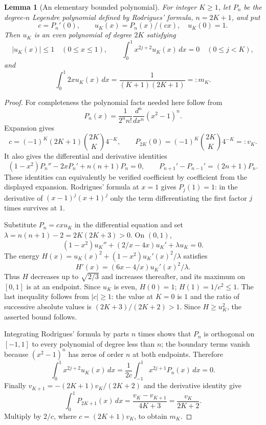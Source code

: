\documentclass[11pt]{article}
\newtheorem{lemma}{Lemma}
\begin{document}
\begin{lemma}[An elementary bounded polynomial]\label{lem:poly}
For integer $K\ge1$, let $P_n$ be the degree-$n$ Legendre polynomial defined
by Rodrigues' formula, $n=2K+1$, and put
\[
 c=P_n'(0),\qquad u_K(x)=P_n(x)/(cx),\quad u_K(0)=1.
\]
Then $u_K$ is an even polynomial of degree $2K$ satisfying
\[
 |u_K(x)|\le1\quad(0\le x\le1),\qquad
 \int_0^1x^{2j+2}u_K(x)\,dx=0\quad(0\le j<K),
\]
and
\[
 \int_0^1 2x u_K(x)\,dx=\frac1{(K+1)(2K+1)}=:m_K.
\]
\end{lemma}
\begin{proof}
For completeness the polynomial facts needed here follow from
\[
 P_n(x)=\frac1{2^n n!}\frac{d^n}{dx^n}(x^2-1)^n.
\]
Expansion gives
\[
 c=(-1)^K(2K+1){\binom{2K}{K}}4^{-K},\qquad
 P_{2K}(0)=(-1)^K\binom{2K}{K}4^{-K}=:v_K.
\]
It also gives the differential and derivative identities
\[
 (1-x^2)P_n''-2xP_n'+n(n+1)P_n=0,
 \qquad P_{n+1}'-P_{n-1}'=(2n+1)P_n.
\]
These identities can equivalently be verified coefficient by coefficient
from the displayed expansion. Rodrigues' formula at $x=1$ gives $P_j(1)=1$:
in the derivative of $(x-1)^j(x+1)^j$ only the term differentiating the first
factor $j$ times survives at $1$.

Substitute $P_n=cxu_K$ in the differential equation and set
$\lambda=n(n+1)-2=2K(2K+3)>0$. On $(0,1)$,
\[
 (1-x^2)u_K''+(2/x-4x)u_K'+\lambda u_K=0.
\]
The energy $H(x)=u_K(x)^2+(1-x^2)u_K'(x)^2/\lambda$ satisfies
\[
 H'(x)=(6x-4/x)u_K'(x)^2/\lambda.
\]
Thus $H$ decreases up to $\sqrt{2/3}$ and increases thereafter, and its
maximum on $[0,1]$ is at an endpoint. Since $u_K$ is even, $H(0)=1$;
$H(1)=1/c^2\le1$. The last inequality follows from $|c|\ge1$: the value
at $K=0$ is $1$ and the ratio of successive absolute values is
$(2K+3)/(2K+2)>1$. Since $H\ge u_K^2$, the asserted bound follows.

Integrating Rodrigues' formula by parts $n$ times shows that $P_n$ is
orthogonal on $[-1,1]$ to every polynomial of degree less than $n$; the
boundary terms vanish because $(x^2-1)^n$ has zeros of order $n$ at both
endpoints. Therefore
\[
 \int_0^1x^{2j+2}u_K(x)\,dx
 =\frac1{2c}\int_{-1}^1x^{2j+1}P_n(x)\,dx=0.
\]
Finally $v_{K+1}=-(2K+1)v_K/(2K+2)$ and the derivative identity give
\[
 \int_0^1P_{2K+1}(x)\,dx
 =\frac{v_K-v_{K+1}}{4K+3}=\frac{v_K}{2K+2}.
\]
Multiply by $2/c$, where $c=(2K+1)v_K$, to obtain $m_K$.
\end{proof}
\end{document}
